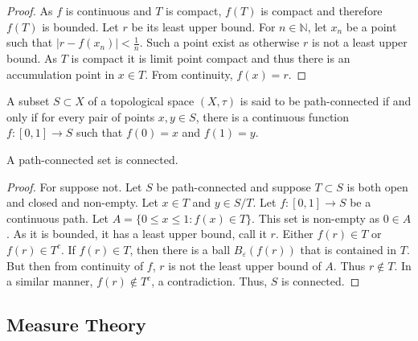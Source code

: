 \documentclass[crop=false,class=article,oneside]{standalone}
\begin{document}
            \begin{proof}
            As $f$ is continuous and $T$ is compact, $f(T)$ is compact and therefore $f(T)$ is bounded. Let $r$ be its least upper bound. For $n\in \mathbb{N}$, let $x_n$ be a point such that $|r-f(x_n)|< \frac{1}{n}$. Such a point exist as otherwise $r$ is not a least upper bound. As $T$ is compact it is limit point compact and thus there is an accumulation point in $x\in T$. From continuity, $f(x) = r$.
            \end{proof}
            \begin{definition}
            A subset $S\subset X$ of a topological space $(X,\tau)$ is said to be path-connected if and only if for every pair of points $x,y\in S$, there is a continuous function $f:[0,1]\rightarrow S$ such that $f(0)=x$ and $f(1)=y$.
            \end{definition}
            \begin{theorem}
            A path-connected set is connected.
            \end{theorem}
            \begin{proof}
            For suppose not. Let $S$ be path-connected and suppose $T\subset S$ is both open and closed and non-empty. Let $x\in T$ and $y\in S/T$. Let $f:[0,1]\rightarrow S$ be a continuous path. Let $A =\{0\leq x \leq 1: f(x) \in T\}$. This set is non-empty as $0\in A$. As it is bounded, it has a least upper bound, call it $r$. Either $f(r)\in T$ or $f(r)\in T^c$. If $f(r)\in T$, then there is a ball $B_{\varepsilon}(f(r))$ that is contained in $T$. But then from continuity of $f$, $r$ is not the least upper bound of $A$. Thus $r\notin T$. In a similar manner, $f(r)\notin T^c$, a contradiction. Thus, $S$ is connected.
            \end{proof}
        \subsection{Measure Theory}
\end{document}
